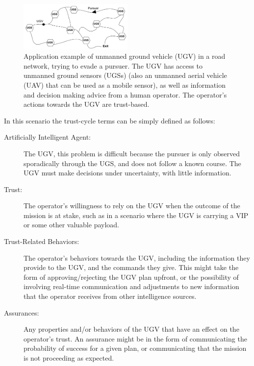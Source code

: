 	\begin{figure}[htbp]
    	\centering
     	\includegraphics[width=0.5\textwidth]{Figures/RoadNet}
    	\caption{Application example of unmanned ground vehicle (UGV) in a road network, trying to evade a pursuer. The UGV has access to unmanned ground sensors (UGSs) (also an unmanned aerial vehicle (UAV) that can be used as a mobile sensor), as well as information and decision making advice from a human operator. The operator's actions towards the UGV are trust-based.}
        \label{fig:RoadNet}
    \end{figure}

    In this scenario the trust-cycle terms can be simply defined as follows:

    \begin{description}
        \item [Artificially Intelligent Agent:] The UGV, this problem is difficult because the pursuer is only observed sporadically through the UGS, and does not follow a known course. The UGV must make decisions under uncertainty, with little information. 
        \item [Trust:] The operator's willingness to rely on the UGV when the outcome of the mission is at stake, such as in a scenario where the UGV is carrying a VIP or some other valuable payload.
        \item [Trust-Related Behaviors:] The operator's behaviors towards the UGV, including the information they provide to the UGV, and the commands they give. This might take the form of approving/rejecting the UGV plan upfront, or the possibility of involving real-time communication and adjustments to new information that the operator receives from other intelligence sources.
        \item [Assurances:] Any properties and/or behaviors of the UGV that have an effect on the operator's trust. An assurance might be in the form of communicating the probability of success for a given plan, or communicating that the mission is not proceeding as expected.
    \end{description}


